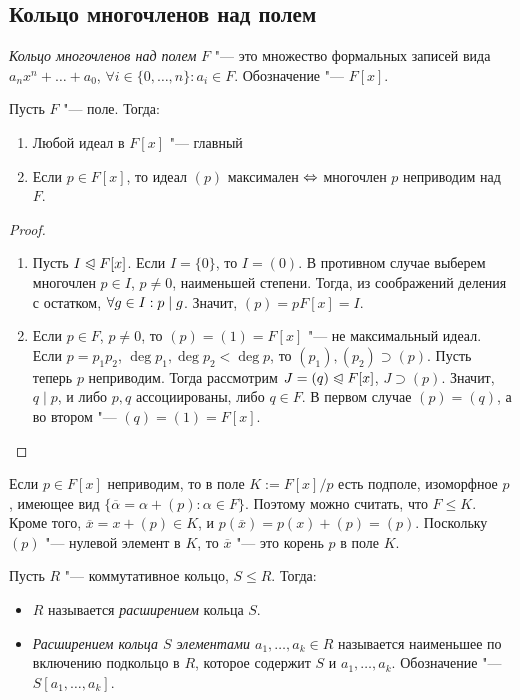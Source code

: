 \subsection{Кольцо многочленов над полем}

\begin{reminder}
	\textit{Кольцо многочленов над полем} $F$ "--- это множество формальных записей вида $a_nx^n + \dotsc + a_0$, $\forall i \in \{0, \dotsc, n\} : a_i \in F$. Обозначение "--- $F[x]$.
\end{reminder}

\begin{theorem} Пусть $F$ "--- поле. Тогда:
	\begin{enumerate}
		\item Любой идеал в $F[x]$ "--- главный
		\item Если $p \in F[x]$, то идеал $(p)$ максимален $\Leftrightarrow$ многочлен $p$ неприводим над $F$.
	\end{enumerate}
\end{theorem}

\begin{proof}~
	\begin{enumerate}
		\item Пусть $I \trianglelefteqslant F[x]$. Если $I = \{0\}$, то $I = (0)$. В противном случае выберем многочлен $p \in I$, $p \ne 0$, наименьшей степени. Тогда, из соображений деления с остатком, $\forall g \hm\in I: p \mid g$. Значит, $(p) = pF[x] = I$.
		\item Если $p \in F$, $p \ne 0$, то $(p) = (1) = F[x]$ "--- не максимальный идеал. Если $p = p_1p_2$, $\deg{p_1}, \deg{p_2} < \deg{p}$, то $(p_1), (p_2) \supset (p)$. Пусть теперь $p$ неприводим. Тогда рассмотрим $J = (q) \trianglelefteqslant F[x]$, $J \supset (p)$. Значит, $q \mid p$, и либо $p, q$ ассоциированы, либо $q \in F$. В первом случае $(p) = (q)$, а во втором "--- $(q) = (1) = F[x]$.
	\end{enumerate}
\end{proof}

\begin{note}
	Если $p \in F[x]$ неприводим, то в поле $K := F[x] / p$ есть подполе, изоморфное $p$, имеющее вид $\{\overline{\alpha} = \alpha + (p): \alpha \in F\}$. Поэтому можно считать, что $F \le K$. Кроме того, $\overline{x} = x + (p) \in K$, и $p(\overline{x}) = p(x) + (p) = (p)$. Поскольку $(p)$ "--- нулевой элемент в $K$, то $\overline{x}$ "--- это корень $p$ в поле $K$.
\end{note}

\begin{definition}
	Пусть $R$ "--- коммутативное кольцо, $S \le R$. Тогда:
	\begin{itemize}
		\item $R$ называется \textit{расширением} кольца $S$.
		\item \textit{Расширением кольца $S$ элементами $a_1, \dotsc, a_k \in R$} называется наименьшее по включению подкольцо в $R$, которое содержит $S$ и $a_1, \dotsc, a_k$. Обозначение "--- $S[a_1, \dotsc, a_k]$.
	\end{itemize}
\end{definition}

